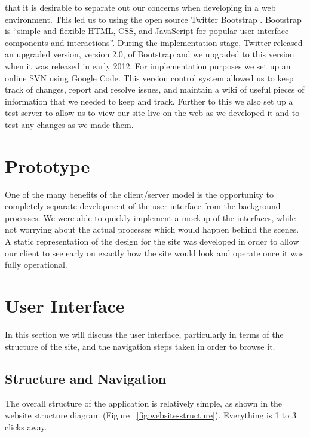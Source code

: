 \documentclass{l3proj}
\begin{document}
that it is desirable to separate out our concerns when developing in a web
environment. This led us to using the open source Twitter Bootstrap
\cite{tb}. Bootstrap is ``simple and
flexible HTML, CSS, and JavaScript for popular user interface components and
interactions''. During the implementation stage, Twitter released an upgraded version,
version 2.0, of Bootstrap and we upgraded to this version when it was released
in early 2012.\newline
\newline
For implementation purposes we set up an online
SVN using Google Code. This version control system allowed us to keep track of
changes, report and resolve issues, and maintain a wiki of useful pieces of
information that we needed to keep and track.\newline
\newline Further to this we also set up a test server to allow us to view our site live on the web as we
developed it and to test any changes as we made them.\newline
\newline

\section{Prototype} \label{sect:proto}
One of the many benefits of the client/server model is the opportunity to
completely separate development of the user interface from the background
processes. 
We were able to quickly implement a mockup of the interfaces, while not worrying
about the actual processes which would happen behind the scenes. A static
representation of the design for the site was developed in order to allow our
client to see early on exactly how the site would look and operate once it was
fully operational.

\section{User Interface} \label{sect:ui} 

In this section we will discuss the user interface, particularly in terms of the structure of
the site, and the navigation steps taken in order to browse it.

\subsection{Structure and Navigation}

The overall structure of the application is relatively simple, as shown 
in the website structure diagram (Figure ~\ref{fig:website-structure}). 
Everything is 1 to 3 clicks away.
\end{document}

